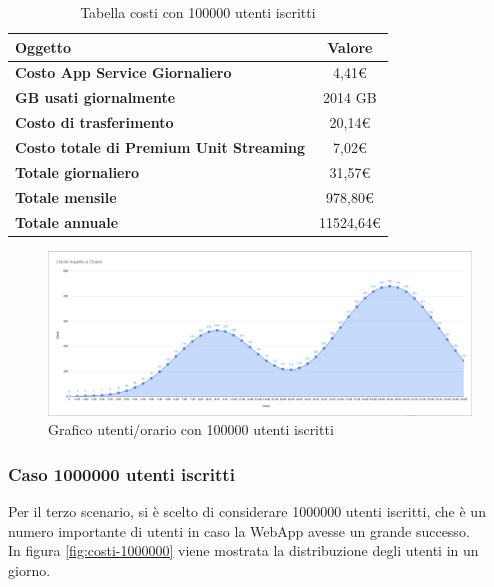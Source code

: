\begin{table}[H]
    \label{tab:costi-100000}
    \begin{tabularx}{\textwidth}{|X|c|}
        \hline
        \textbf{Oggetto} & \textbf{Valore} \\\hline
        
        \textbf{Costo App Service Giornaliero} & {4,41€} \\ 
        \hline
        \textbf{GB usati giornalmente} & {2014 GB} \\ 
        \hline
        \textbf{Costo di trasferimento} & {20,14€}\\
        \hline
        \textbf{Costo totale di Premium Unit Streaming} & {7,02€}\\  
        \hline
        \textbf{Totale giornaliero} & {31,57€}\\  
        \hline
        \textbf{Totale mensile} & {978,80€}\\  
        \hline
        \textbf{Totale annuale} & {11524,64€}\\  
        \hline
    \end{tabularx}
    \caption{Tabella costi con 100000 utenti iscritti}
\end{table}
\begin{figure}[H]
    \centering
    \includegraphics[scale=0.3]{images/costi/100kuser.png}
    \caption{Grafico utenti/orario con 100000 utenti iscritti}
    \label{fig:costi-100000}
\end{figure}
\pagebreak
\subsubsection{Caso 1000000 utenti iscritti}
Per il terzo scenario, si è scelto di considerare 1000000 utenti iscritti, che è un numero importante di utenti in caso la WebApp avesse un grande successo.\\
In figura \ref{fig:costi-1000000} viene mostrata la distribuzione degli utenti in un giorno.

